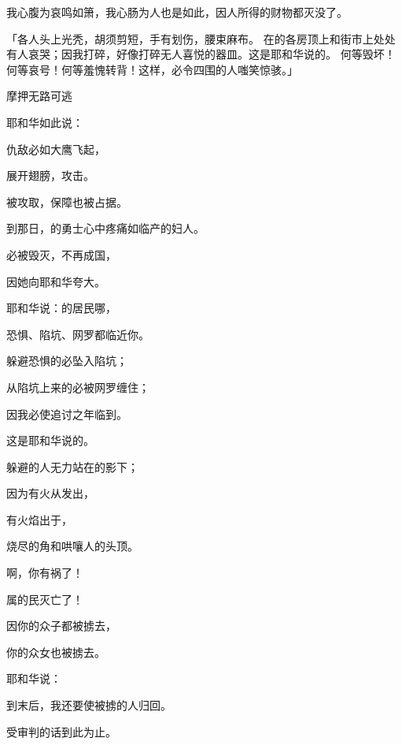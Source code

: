 {我心腹为{}哀鸣如箫，我心肠为{}人也是如此，因{}人所得的财物都灭没了。
\par }{\PP {}「各人头上光秃，胡须剪短，手有划伤，腰束麻布。
在{}的各房顶上和街市上处处有人哀哭；因我打碎{}，好像打碎无人喜悦的器皿。这是耶和华说的。
何等毁坏！何等哀号！何等羞愧转背！这样，{}必令四围的人嗤笑惊骇。」
\par }{\SH 摩押无路可逃
\par }{\Q {}耶和华如此说：
\par }{\Q 仇敌必如大鹰飞起，
\par }{\Q 展开翅膀，攻击{}。
\par }{\Q {}被攻取，保障也被占据。
\par }{\Q 到那日，{}的勇士心中疼痛如临产的妇人。
\par }{\Q {}必被毁灭，不再成国，
\par }{\Q 因她向耶和华夸大。
\par }{\Q {}耶和华说：{}的居民哪，
\par }{\Q 恐惧、陷坑、网罗都临近你。
\par }{\Q {}躲避恐惧的必坠入陷坑；
\par }{\Q 从陷坑上来的必被网罗缠住；
\par }{\Q 因我必使追讨之年临到{}。
\par }{\Q 这是耶和华说的。
\par }{\BB \par }{\Q {}躲避的人无力站在{}的影下；
\par }{\Q 因为有火从{}发出，
\par }{\Q 有火焰出于{}{}，
\par }{\Q 烧尽{}的角和哄嚷人的头顶。
\par }{\Q {}啊，你有祸了！
\par }{\Q 属{}的民灭亡了！
\par }{\Q 因你的众子都被掳去，
\par }{\Q 你的众女也被掳去。
\par }{\Q {}耶和华说：
\par }{\Q 到末后，我还要使被掳的{}人归回。
\par }{受审判的话到此为止。

}
